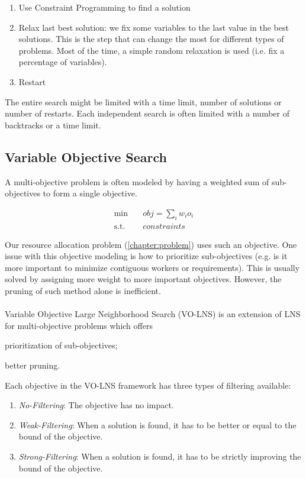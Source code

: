 \documentclass[../../thesis.tex]{subfiles}
\begin{document}
\begin{enumerate}
  \item Use Constraint Programming to find a solution 
  \item Relax last best solution: we fix some variables to the last value in the best solutions. This is the 
        step that can change the most for different types of problems. Most of the time, a simple random relaxation is used (i.e. fix a percentage of variables).
  \item Restart
\end{enumerate}

The entire search might be limited with a time limit, number of solutions or number of restarts. Each independent search 
is often limited with a number of backtracks or a time limit.

\subsection{Variable Objective Search}

A multi-objective problem is often modeled by having a weighted sum of sub-objectives to form a 
single objective. 

\begin{align*}
  \text{min} \quad & obj = \sum_{i} w_i o_i \\
  \text{s.t.} \quad & constraints
\end{align*}

Our resource allocation problem (\autoref{chapter:problem}) uses such an objective. One issue with this objective modeling is how 
to prioritize sub-objectives (e.g. is it more important to minimize contiguous workers or requirements). This is 
usually solved by assigning more weight to more important objectives. However, the pruning of such method alone is inefficient.

\paragraph{}

Variable Objective Large Neighborhood Search (VO-LNS) \cite{Schaus:VOLNS} is an extension of LNS for multi-objective 
problems which offers
\begin{enumerate*}[label=(\roman*)]
  \item prioritization of sub-objectives;
  \item better pruning.
\end{enumerate*}
Each objective in the VO-LNS framework has three types of filtering available:
\begin{enumerate}
  \item \emph{No-Filtering}: The objective has no impact.
  \item \emph{Weak-Filtering}: When a solution is found, it has to be better or equal to the bound of the objective. 
  \item \emph{Strong-Filtering}: When a solution is found, it has to be strictly improving the bound of the objective.
\end{enumerate}
\end{document}
